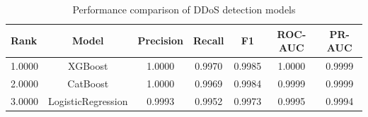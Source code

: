 \begin{table}
\caption{Performance comparison of DDoS detection models}
\label{tab:model_comparison}
\begin{tabular}{lcccccc}
\midrule
Rank & Model & Precision & Recall & F1 & ROC-AUC & PR-AUC \\
\midrule
1.0000 & XGBoost & 1.0000 & 0.9970 & 0.9985 & 1.0000 & 0.9999 \\
2.0000 & CatBoost & 1.0000 & 0.9969 & 0.9984 & 0.9999 & 0.9999 \\
3.0000 & LogisticRegression & 0.9993 & 0.9952 & 0.9973 & 0.9995 & 0.9994 \\
\bottomrule
\end{tabular}
\end{table}
